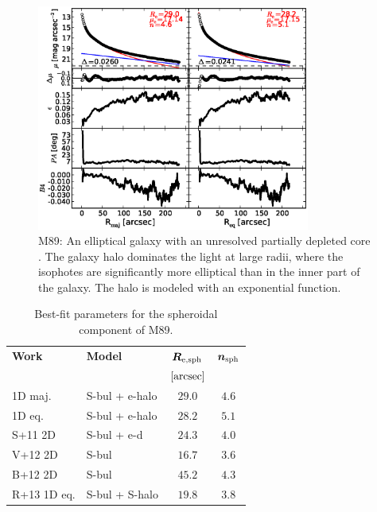 \documentclass[preprint2]{emulateapj}
\newcommand{\fitfigurewidth}{0.8\textwidth}
\begin{document}
  \begin{figure}[h]
  \begin{center}
  \includegraphics[width=\fitfigurewidth]{m89_1Dfit.eps}
  \caption{M89: 
  An elliptical galaxy with an unresolved partially depleted core \citep{rusli2013}. 
  The galaxy halo dominates the light at large radii, where the isophotes are significantly more elliptical than in the inner part of the galaxy. 
  The halo is modeled with an exponential function. 
  }
  \end{center}
  \end{figure}

  \begin{table}[h]
  \small
  \caption{Best-fit parameters for the spheroidal component of M89.}
  \begin{center}
  \begin{tabular}{llcc}
  \hline
  {\bf Work} & {\bf Model}   & $\bm R_{\rm e,sph}$    & $\bm n_{\rm sph}$ \\
    &  &  $[\rm arcsec]$ & \\
  \hline
  1D maj. & S-bul + e-halo  & $29.0$  &  $4.6$ \\
  1D eq.  & S-bul + e-halo  & $28.2$  &  $5.1$ \\
  \hline
  S+11 2D         & S-bul + e-d     & $24.3$  &  $4.0$ \\
  V+12 2D         & S-bul           & $16.7$  &  $3.6$ \\
  B+12 2D         & S-bul           & $45.2$  &  $4.3$ \\
  R+13 1D eq.         & S-bul + S-halo  & $19.8$  &  $3.8$ \\
  \hline
  \end{tabular}
  \end{center}
  \label{tab:m89}
  \end{table}
\end{document}
